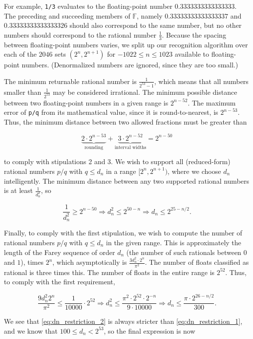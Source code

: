 \documentclass{article}
\newcommand{\finitefp}{\mathbb{F}}
\begin{document}
For example, \texttt{1/3} evaluates to the floating-point number $0.3333333333333333$. The preceding and succeeding members of $\finitefp$, namely $0.33333333333333337$ and $0.33333333333333326$ should also correspond to the same number, but no other numbers should correspond to the rational number $\frac{1}{3}$. Because the spacing between floating-point numbers varies, we split up our recognition algorithm over each of the $2046$ sets $\left(2^n, 2^{n+1}\right)$ for $-1022\leq n\leq 1023$ available to floating-point numbers. (Denormalized numbers are ignored, since they are too small.)

The minimum returnable rational number is $\frac{1}{2^{53}-1}$, which means that all numbers smaller than $\frac{1}{2^{53}}$ may be considered irrational. The minimum possible distance between two floating-point numbers in a given range is $2^{n-52}$. The maximum error of \texttt{p/q} from its mathematical value, since it is round-to-nearest, is $2^{n-53}$. Thus, the minimum distance between two allowed fractions must be greater than

$$\underbrace{2\cdot 2^{n-53}}_{\text{rounding}}+\underbrace{3\cdot 2^{n-52}}_{\text{interval widths}} = 2^{n-50}$$

to comply with stipulations 2 and 3. We wish to support all (reduced-form) rational numbers $p/q$ with $q \leq d_n$ in a range $[2^n, 2^{n+1})$, where we choose $d_n$ intelligently. The minimum distance between any two supported rational numbers is at least $\frac{1}{d_n^2}$, so

$$\frac{1}{d_n^2} \geq 2^{n-50}\Longrightarrow d_n^2 \leq 2^{50-n}\Longrightarrow d_n \leq 2^{25 - n/2}. \label{eq:dn_restriction_1}$$

Finally, to comply with the first stipulation, we wish to compute the number of rational numbers $p/q$ with $q \leq d_n$ in the given range. This is approximately the length of the Farey sequence of order $d_n$ (the number of such rationals between $0$ and $1$), times $2^n$, which asymptotically is $\frac{3d_n^2\cdot 2^n}{\pi^2}$. The number of floats classified as rational is three times this. The number of floats in the entire range is $2^{52}$. Thus, to comply with the first requirement,

$$\frac{9d_n^2 2^n}{\pi^2} \leq \frac{1}{10000}\cdot 2^{52}\Longrightarrow d_n^2 \leq \frac{\pi^2\cdot 2^{52}\cdot 2^{-n}}{9\cdot 10000} \Longrightarrow d_n \leq \frac{\pi\cdot 2^{26 - n/2}}{300}. \label{eq:dn_restriction_2}$$

We see that \eqref{eq:dn_restriction_2} is always stricter than \eqref{eq:dn_restriction_1}, and we know that $100 \leq d_n < 2^{53}$, so the final expression is now
\end{document}
